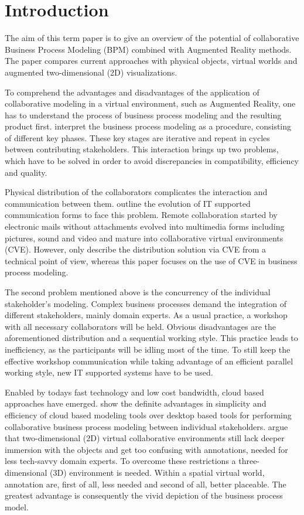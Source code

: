 \section{Introduction}

The aim of this term paper is to give an overview of the potential of collaborative Business Process Modeling (BPM) combined with Augmented 
Reality methods. The paper compares current approaches with physical objects, virtual worlds and augmented two-dimensional (2D) visualizations. 


To comprehend the advantages and disadvantages of the application of collaborative modeling in a virtual environment, 
such as Augmented Reality, one has to understand the process of business process modeling and the resulting product first. 
 interpret the business process modeling as a procedure, consisting of different key phases. 
These key stages are iterative and repeat in cycles between contributing stakeholders. This interaction brings up two problems, 
which have to be solved in order to avoid discrepancies in compatibility, efficiency and quality. 


Physical distribution of the collaborators complicates the interaction and communication between them.  outline
the evolution of IT supported communication forms to face this problem. Remote collaboration started by electronic mails without 
attachments evolved into multimedia forms including pictures, sound and video and mature into collaborative virtual environments (CVE).
However,  only describe the distribution solution via CVE from a technical point of view, whereas this paper
focuses on the use of CVE in business process modeling. 


The second problem mentioned above is the concurrency of the individual stakeholder's modeling. Complex business processes demand 
the integration of different stakeholders, mainly domain experts. As a usual practice, a workshop with all necessary collaborators 
will be held. Obvious disadvantages are the aforementioned distribution and a sequential working style. This practice leads to 
inefficiency, as the participants will be idling most of the time. To still keep the effective workshop communication while taking 
advantage of an efficient parallel working style, new IT supported systems have to be used. \cite{Nolte2011}


Enabled by todays fast technology and low cost bandwidth, cloud based approaches have emerged.  show the 
definite advantages in simplicity and efficiency of cloud based modeling tools over desktop based tools for performing collaborative 
business process modeling between individual stakeholders.  argue that two-dimensional (2D) virtual
collaborative environments still lack deeper immersion with the objects and get too confusing with annotations, needed for less 
tech-savvy domain experts. To overcome these restrictions a three-dimensional (3D) environment is needed. Within a spatial virtual 
world, annotation are, first of all, less needed and second of all, better placeable. The greatest advantage is consequently the vivid 
depiction of the business process model.


